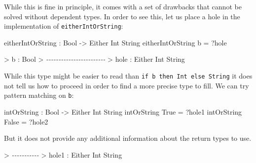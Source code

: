 \documentclass[
]{article}
\newenvironment{Shaded}{}{}
\newcommand{\CommentTok}[1]{\textcolor[rgb]{0.38,0.63,0.69}{\textit{#1}}}
\newcommand{\DataTypeTok}[1]{\textcolor[rgb]{0.56,0.13,0.00}{#1}}
\newcommand{\NormalTok}[1]{#1}
\newcommand{\OperatorTok}[1]{\textcolor[rgb]{0.40,0.40,0.40}{#1}}
\newcommand{\OtherTok}[1]{\textcolor[rgb]{0.00,0.44,0.13}{#1}}
\begin{document}
While this is fine in principle, it comes with a set of drawbacks that
cannot be solved without dependent types. In order to see this, let us
place a hole in the implementation of \texttt{eitherIntOrString}:

\begin{Shaded}
\begin{Highlighting}[]
\NormalTok{eitherIntOrString }\OperatorTok{:} \DataTypeTok{Bool} \OtherTok{{-}\textgreater{}} \DataTypeTok{Either} \DataTypeTok{Int} \DataTypeTok{String}
\NormalTok{eitherIntOrString b }\OtherTok{=} \OperatorTok{?}\NormalTok{hole}
\end{Highlighting}
\end{Shaded}

\begin{Shaded}
\begin{Highlighting}[]
\OperatorTok{\textgreater{}}\NormalTok{ b }\OperatorTok{:} \DataTypeTok{Bool}
\OperatorTok{\textgreater{}} \CommentTok{{-}{-}{-}{-}{-}{-}{-}{-}{-}{-}{-}{-}{-}{-}{-}{-}{-}{-}{-}{-}{-}{-}{-}{-}}
\OperatorTok{\textgreater{}}\NormalTok{ hole }\OperatorTok{:} \DataTypeTok{Either} \DataTypeTok{Int} \DataTypeTok{String}
\end{Highlighting}
\end{Shaded}

While this type might be easier to read than
\texttt{if\ b\ then\ Int\ else\ String} it does not tell us how to
proceed in order to find a more precise type to fill. We can try pattern
matching on \texttt{b}:

\begin{Shaded}
\begin{Highlighting}[]
\NormalTok{intOrString\textquotesingle{} }\OperatorTok{:} \DataTypeTok{Bool} \OtherTok{{-}\textgreater{}} \DataTypeTok{Either} \DataTypeTok{Int} \DataTypeTok{String}
\NormalTok{intOrString\textquotesingle{} }\DataTypeTok{True} \OtherTok{=} \OperatorTok{?}\NormalTok{hole1}
\NormalTok{intOrString\textquotesingle{} }\DataTypeTok{False} \OtherTok{=} \OperatorTok{?}\NormalTok{hole2}
\end{Highlighting}
\end{Shaded}

But it does not provide any additional information about the return
types to use.

\begin{Shaded}
\begin{Highlighting}[]
\OperatorTok{\textgreater{}} \CommentTok{{-}{-}{-}{-}{-}{-}{-}{-}{-}{-}{-}}
\OperatorTok{\textgreater{}}\NormalTok{ hole1 }\OperatorTok{:} \DataTypeTok{Either} \DataTypeTok{Int} \DataTypeTok{String}
\end{Highlighting}
\end{Shaded}
\end{document}
